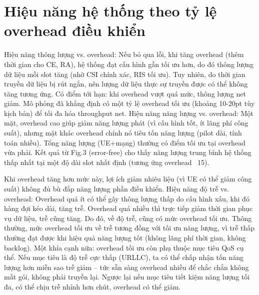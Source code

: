 \section{Hiệu năng hệ thống theo tỷ lệ overhead điều khiển}

Hiệu năng thông lượng vs. overhead: Nếu bỏ qua lỗi, khi tăng overhead (thêm thời gian cho CE, RA), hệ thống đạt cấu hình gần tối ưu hơn, do đó thông lượng dữ liệu mỗi slot tăng (nhờ CSI chính xác, RIS tối ưu). Tuy nhiên, do thời gian truyền dữ liệu bị rút ngắn, nên lượng dữ liệu thực sự truyền được có thể không tăng tương ứng. Có điểm tới hạn: khi overhead vượt quá mức, thông lượng net giảm. Mô phỏng đã khẳng định có một tỷ lệ overhead tối ưu (khoảng 10-20pt tùy kịch bản) để tối đa hóa throughput net. Hiệu năng năng lượng vs. overhead: Một mặt, overhead cao giúp giảm năng lượng phát (vì cấu hình tốt, ít lãng phí công suất), nhưng mặt khác overhead chính nó tiêu tốn năng lượng (pilot dài, tính toán nhiều). Tổng năng lượng (UE+mạng) thường có điểm tối ưu tại overhead vừa phải. Kết quả từ Fig.3 (error-free) cho thấy năng lượng trung bình hệ thống thấp nhất tại một độ dài slot nhất định (tương ứng overhead ~15).


Khi overhead tăng hơn mức này, lợi ích giảm nhiêu liệu (vì UE có thể giảm công suất) không đủ bù đắp năng lượng phần điều khiển. Hiệu năng độ trễ vs. overhead: Overhead quá ít có thể gây thông lượng thấp do cấu hình xấu, khi đó hàng đợi kéo dài, tăng trễ. Overhead quá nhiều thì trực tiếp giảm thời gian phục vụ dữ liệu, trễ cũng tăng. Do đó, về độ trễ, cũng có mức overhead tối ưu. Thông thường, mức overhead tối ưu về trễ tương đồng với tối ưu năng lượng, vì trễ thấp thường đạt được khi hiệu quả năng lượng tốt (không lãng phí thời gian, không backlog). Một khía cạnh nữa: overhead tối ưu còn phụ thuộc mục tiêu QoS cụ thể. Nếu mục tiêu là độ trễ cực thấp (URLLC), ta có thể chấp nhận tốn năng lượng hơn miễn sao trễ giảm – tức sẵn sàng overhead nhiều để chắc chắn không mất gói, không phải truyền lại. Ngược lại nếu mục tiêu tiết kiệm năng lượng tối đa, có thể chịu trễ nhỉnh hơn chút, overhead có thể giảm.